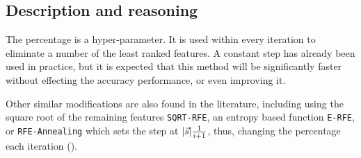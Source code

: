 \subsection{Description and reasoning}
\label{sec:dynamicStep.desc}

The percentage is a hyper-parameter. It is used within every iteration to eliminate a number of the least ranked features. A constant step has already been used in pract\-ice, but it is expected that this method will be significantly faster without effecting the accuracy performance, or even improving it.

Other similar modifications are also found in the literature, including using the square root of the remaining features \texttt{SQRT-RFE}, an entropy based function \texttt{E-RFE}, or \texttt{RFE-Annealing} which sets the step at $|\vec{s}| \frac{1}{i+1}$, thus, changing the percentage each iteration (\cite{ding_improving_2006}).

